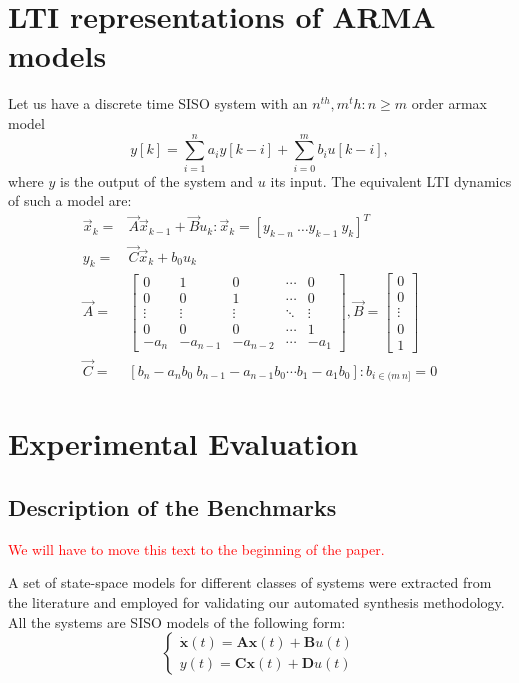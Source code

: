 \documentclass[runningheads,a4paper]{llncs}
\begin{document}
\section{LTI representations of ARMA models}

Let us have a discrete time SISO system with an $n^{th},m{^th} : n\geq m$ order armax model
$$y[k]=\sum_{i=1}^n a_iy[k-i]+\sum_{i=0}^m b_iu[k-i],$$
where $y$ is the output of the system and $u$ its input.
The equivalent LTI dynamics of such a model are:
\begin{align}
\vec{x}_k=&\vec{A}\vec{x}_{k-1}+\vec{B}u_k : \vec{x}_k=[y_{k-n}\ \hdots y_{k-1}\ y_{k}]^T\\
y_k=&\vec{C}\vec{x}_k + b_0u_k\nonumber\\
\vec{A}=&\left[
\begin{array}{ccccc}
0&1&0&\cdots&0\\
0&0&1&\cdots&0\\
\vdots&\vdots&\vdots&\ddots&\vdots\\
0&0&0&\cdots&1\\
-a_n&-a_{n-1}&-a_{n-2}&\cdots&-a_1
\end{array}\right],
\vec{B}=\left[
\begin{array}{c}
0\\0\\ \vdots\\ 0\\ 1
\end{array}\right]\nonumber\\
\vec{C}=&[b_n-a_nb_0\ b_{n-1}-a_{n-1}b_0 \cdots b_1-a_1b_0] : b_{i \in (m\ n]}=0\nonumber
\end{align}

\section{Experimental Evaluation}


\subsection{Description of the Benchmarks}

\textcolor{red}{We will have to move this text to the beginning of the paper.}

A set of state-space models for different classes of systems were extracted from the literature and employed for validating our automated synthesis methodology. All the systems are SISO models of the following form:
\begin{equation}
\left\lbrace\begin{array}{c}
\dot{\textbf{x}}(t)=\textbf{A}\textbf{x}(t)+\textbf{B}u(t)\\
y(t)=\textbf{C}\textbf{x}(t)+\textbf{D}u(t)
\end{array}\right.
\end{equation}
\end{document}
